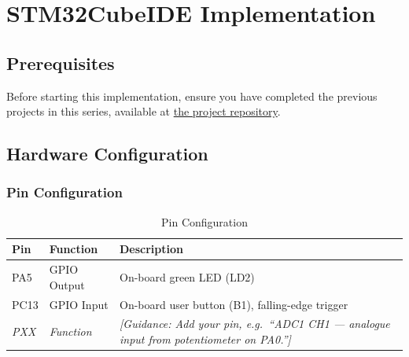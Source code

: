 \section{STM32CubeIDE Implementation}

\subsection{Prerequisites}

Before starting this implementation, ensure you have completed
the previous projects in this series, available at
\href{https://github.com/Anmol-G-K/NUCLEO-G474RE-PowerElectronics-Guide/tree/main/Examples}{the project repository}.


\subsection{Hardware Configuration}

\subsubsection{Pin Configuration}

\begin{table}[H]
    \centering
    \caption{Pin Configuration}
    \label{tab:pin_config_cube}
    \begin{tabularx}{\textwidth}{|l|l|X|}
        \hline
        \textbf{Pin} & \textbf{Function} & \textbf{Description} \\
        \hline
        PA5  & GPIO Output & On-board green LED (LD2) \\
        \hline
        PC13 & GPIO Input  & On-board user button (B1), falling-edge trigger \\
        \hline
        \textit{PXX} & \textit{Function} &
            \textit{[Guidance: Add your pin, e.g.\ ``ADC1 CH1 ---
            analogue input from potentiometer on PA0.'']} \\
        \hline
    \end{tabularx}
\end{table}

